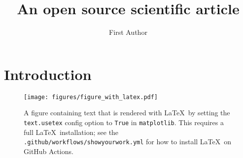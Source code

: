 \documentclass[twocolumn]{aastex631}
\begin{document}
\title{An open source scientific article}

\author{First Author}

\begin{abstract}
    \blindtext
\end{abstract}

\section{Introduction}

\blindtext

\begin{figure}[ht!]
    \begin{centering}
        \texttt{[image: figures/figure\_with\_latex.pdf]}
        \caption{
            A figure containing text that is rendered with \LaTeX\, by setting
            the \texttt{text.usetex} config option to \texttt{True} in 
            \texttt{matplotlib}. This requires a full \LaTeX\, installation; see
            the \texttt{.github/workflows/showyourwork.yml} for how to install
            \LaTeX\, on GitHub Actions.
        }
        \label{fig:figure_with_latex}
    \end{centering}
\end{figure}
\end{document}
